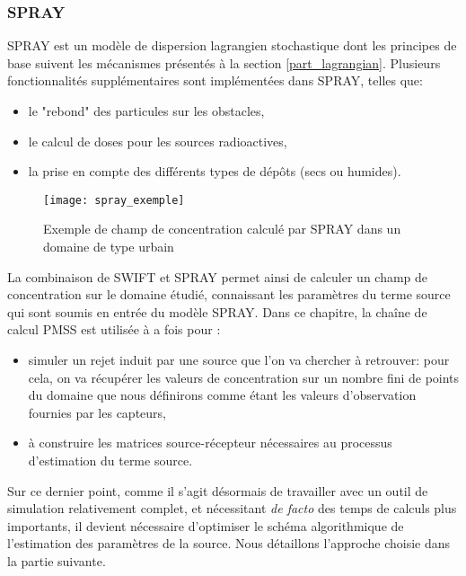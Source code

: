 \subsubsection{SPRAY}

SPRAY est un modèle de dispersion lagrangien stochastique dont les principes de base suivent les mécanismes présentés à la section \ref{part_lagrangian}. Plusieurs fonctionnalités supplémentaires sont implémentées dans SPRAY, telles que: \\

\begin{itemize}
	\item le "rebond" des particules sur les obstacles,
	\item le calcul de doses pour les sources radioactives,
	\item la prise en compte des différents types de dépôts (secs ou humides).\\
\end{itemize}

\begin{figure}[h!]
	\centering
	\texttt{[image: spray\_exemple]}
	\caption{Exemple de champ de concentration calculé par SPRAY dans un domaine de type urbain}
	\label{fig_spray_exemple}
\end{figure}

La combinaison de SWIFT et SPRAY permet ainsi de calculer un champ de concentration sur le domaine étudié, connaissant les paramètres du terme source qui sont soumis en entrée du modèle SPRAY. Dans ce chapitre, la chaîne de calcul PMSS est utilisée à a fois pour : \\

\begin{itemize}
	\item simuler un rejet induit par une source que l'on va chercher à retrouver: pour cela, on va récupérer les valeurs de concentration sur un nombre fini de points du domaine que nous définirons comme étant les valeurs d'observation fournies par les capteurs,
	\item à construire les matrices source-récepteur nécessaires au processus d'estimation du terme source.\\
\end{itemize}

Sur ce dernier point, comme il s'agit désormais de travailler avec un outil de simulation relativement complet, et nécessitant \textit{de facto} des temps de calculs plus importants, il devient nécessaire d'optimiser le schéma algorithmique de l'estimation des paramètres de la source. Nous détaillons l'approche choisie dans la partie suivante.


